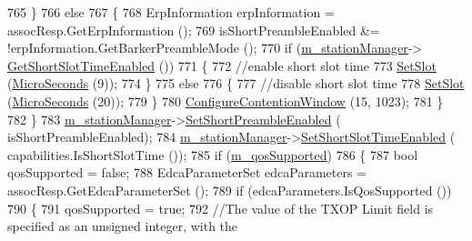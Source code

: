 \begin{DoxyCode}
765                     \}
766                   \textcolor{keywordflow}{else}
767                     \{
768                       ErpInformation erpInformation = assocResp.GetErpInformation ();
769                       isShortPreambleEnabled &= !erpInformation.GetBarkerPreambleMode ();
770                       \textcolor{keywordflow}{if} (\hyperlink{classns3_1_1RegularWifiMac_a76d1a5e27b64bfe36f24a55d1eea2775}{m\_stationManager}->
      \hyperlink{classns3_1_1WifiRemoteStationManager_abbcfcdce410a9673dbdf18a9d7614f8c}{GetShortSlotTimeEnabled} ())
771                         \{
772                           \textcolor{comment}{//enable short slot time}
773                           \hyperlink{classns3_1_1RegularWifiMac_a71241af3585e17c102e51576f19a49b9}{SetSlot} (\hyperlink{group__timecivil_ga17465a639c8d1464e76538afdd78a9f0}{MicroSeconds} (9));
774                         \}
775                       \textcolor{keywordflow}{else}
776                         \{
777                           \textcolor{comment}{//disable short slot time}
778                           \hyperlink{classns3_1_1RegularWifiMac_a71241af3585e17c102e51576f19a49b9}{SetSlot} (\hyperlink{group__timecivil_ga17465a639c8d1464e76538afdd78a9f0}{MicroSeconds} (20));
779                         \}
780                       \hyperlink{classns3_1_1RegularWifiMac_aa6da62735de3b3aaa10f713a8832c3c6}{ConfigureContentionWindow} (15, 1023);
781                     \}
782                 \}
783               \hyperlink{classns3_1_1RegularWifiMac_a76d1a5e27b64bfe36f24a55d1eea2775}{m\_stationManager}->\hyperlink{classns3_1_1WifiRemoteStationManager_a66a2f347bbc24c14a38da8dc56781cc8}{SetShortPreambleEnabled} (
      isShortPreambleEnabled);
784               \hyperlink{classns3_1_1RegularWifiMac_a76d1a5e27b64bfe36f24a55d1eea2775}{m\_stationManager}->\hyperlink{classns3_1_1WifiRemoteStationManager_a127fb3ed96ad66f647c1fa3dc616e274}{SetShortSlotTimeEnabled} (
      capabilities.IsShortSlotTime ());
785               \textcolor{keywordflow}{if} (\hyperlink{classns3_1_1RegularWifiMac_aeecdb918687493a8efdd70304bc0cee9}{m\_qosSupported})
786                 \{
787                   \textcolor{keywordtype}{bool} qosSupported = \textcolor{keyword}{false};
788                   EdcaParameterSet edcaParameters = assocResp.GetEdcaParameterSet ();
789                   \textcolor{keywordflow}{if} (edcaParameters.IsQosSupported ())
790                     \{
791                       qosSupported = \textcolor{keyword}{true};
792                       \textcolor{comment}{//The value of the TXOP Limit field is specified as an unsigned integer, with the
}
\end{DoxyCode}
